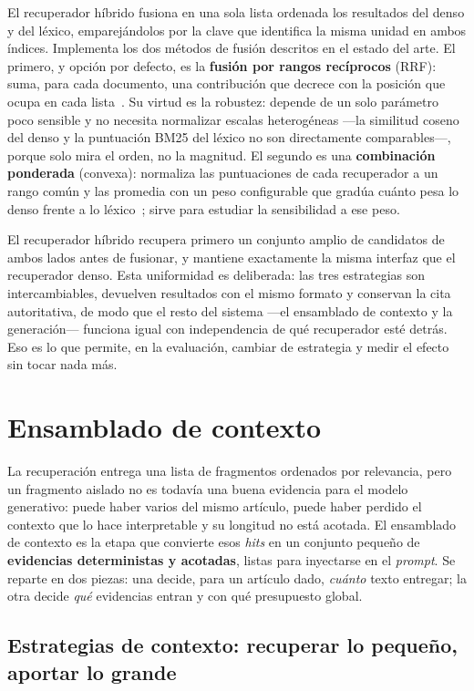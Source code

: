 El recuperador híbrido fusiona en una sola lista ordenada los resultados del denso y del léxico, emparejándolos por la clave que identifica la misma unidad en ambos índices. Implementa los dos métodos de fusión descritos en el estado del arte. El primero, y opción por defecto, es la \textbf{fusión por rangos recíprocos} (RRF): suma, para cada documento, una contribución que decrece con la posición que ocupa en cada lista~\cite{cormack2009rrf}. Su virtud es la robustez: depende de un solo parámetro poco sensible y no necesita normalizar escalas heterogéneas —la similitud coseno del denso y la puntuación BM25 del léxico no son directamente comparables—, porque solo mira el orden, no la magnitud. El segundo es una \textbf{combinación ponderada} (convexa): normaliza las puntuaciones de cada recuperador a un rango común y las promedia con un peso configurable que gradúa cuánto pesa lo denso frente a lo léxico~\cite{bruch2023fusion}; sirve para estudiar la sensibilidad a ese peso.

El recuperador híbrido recupera primero un conjunto amplio de candidatos de ambos lados antes de fusionar, y mantiene exactamente la misma interfaz que el recuperador denso. Esta uniformidad es deliberada: las tres estrategias son intercambiables, devuelven resultados con el mismo formato y conservan la cita autoritativa, de modo que el resto del sistema —el ensamblado de contexto y la generación— funciona igual con independencia de qué recuperador esté detrás. Eso es lo que permite, en la evaluación, cambiar de estrategia y medir el efecto sin tocar nada más.

\section{Ensamblado de contexto}
\label{sec:ensamblado-contexto}

La recuperación entrega una lista de fragmentos ordenados por relevancia, pero un fragmento aislado no es todavía una buena evidencia para el modelo generativo: puede haber varios del mismo artículo, puede haber perdido el contexto que lo hace interpretable y su longitud no está acotada. El ensamblado de contexto es la etapa que convierte esos \emph{hits} en un conjunto pequeño de \textbf{evidencias deterministas y acotadas}, listas para inyectarse en el \emph{prompt}. Se reparte en dos piezas: una decide, para un artículo dado, \emph{cuánto} texto entregar; la otra decide \emph{qué} evidencias entran y con qué presupuesto global.

\subsection{Estrategias de contexto: recuperar lo pequeño, aportar lo grande}
\label{subsec:estrategias-contexto}

